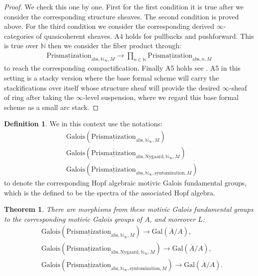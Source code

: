\documentclass[12pt]{article}
\newtheorem{theorem}{Theorem}
\theoremstyle{definition}
\newtheorem{definition}{Definition}
\begin{document}
\begin{proof}
We check this one by one. First for the first condition it is true after we consider the corresponding structure sheaves. The second condition is proved above. For the third condition we consider the corresponding derived $\infty$-categories of quasicoherent sheaves. A4 holds for pullbacks and pushforward. This is true over $\mathbb{N}$ then we consider the fiber product through:
\begin{align}
{\underline{\mathrm{Prismatization}}}_{\mathrm{abs},\mathbb{N}_\infty,M}\rightarrow  \prod_{n\in \mathbb{N}} {\underline{\mathrm{Prismatization}}}_{\mathrm{abs},n,M}
\end{align}
to reach the corresponding compactification. Finally A5 holds see \cite[Chapter 4, in particular 4.7, 4.8, 4.9, 4.10]{3A}. A5 in this setting is a stacky version where the base formal scheme will carry the stackifications over itself whose structure sheaf will provide the desired $\infty$-sheaf of ring after taking the $\infty$-level suspension, where we regard this base formal scheme as a small arc stack.
\end{proof}


\begin{definition}
We in this context use the notations:
\begin{align}
&\mathrm{Galois}(\underline{\mathrm{Prismatization}}_{\mathrm{abs},\mathbb{N}_\infty,M})\\
&\mathrm{Galois}(\overline{\underline{\mathrm{Prismatization}}}_{\mathrm{abs},\mathrm{Nygaard},\mathbb{N}_\infty,M})\\
&\mathrm{Galois}(\overline{\underline{\mathrm{Prismatization}}}_{\mathrm{abs},\mathbb{N}_\infty,\mathrm{syntomization},M})
\end{align}
to denote the corresponding Hopf algebraic motivic Galois fundamental groups, which is the defined to be the spectra of the associated Hopf algebra.
\end{definition}


\begin{theorem}
There are morphisms from these motivic Galois fundamental groups to the corresponding motivic Galois groups of $A$, and moreover $L$: 
\begin{align}
&\mathrm{Galois}(\underline{\mathrm{Prismatization}}_{\mathrm{abs},\mathbb{N}_\infty,M})\rightarrow \mathrm{Gal}(\overline{A}/A),\\
&\mathrm{Galois}(\overline{\underline{\mathrm{Prismatization}}}_{\mathrm{abs},\mathrm{Nygaard},\mathbb{N}_\infty,M})\rightarrow \mathrm{Gal}(\overline{A}/A),\\
&\mathrm{Galois}(\overline{\underline{\mathrm{Prismatization}}}_{\mathrm{abs},\mathbb{N}_\infty,\mathrm{syntomization},M})\rightarrow \mathrm{Gal}(\overline{A}/A).
\end{align}
\end{theorem}
\end{document}
